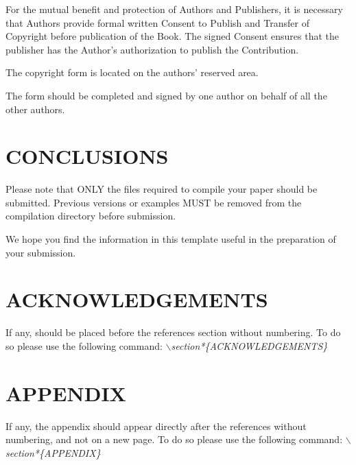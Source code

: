 \documentclass[a4paper,twoside]{article}
\begin{document}
For the mutual benefit and protection of Authors and
Publishers, it is necessary that Authors provide formal written
Consent to Publish and Transfer of Copyright before publication of
the Book. The signed Consent ensures that the publisher has the
Author's authorization to publish the Contribution.

The copyright form is located on the authors' reserved area.

The form should be completed and signed by one author on
behalf of all the other authors.

\section{\uppercase{Conclusions}}
\label{sec:conclusion}

Please note that ONLY the files required to compile your paper should be submitted. Previous versions or examples MUST be removed from the compilation directory before submission.

We hope you find the information in this template useful in the preparation of your submission.


\section*{\uppercase{Acknowledgements}}

If any, should be placed before the references section
without numbering. To do so please use the following command:
\textit{$\backslash$section*\{ACKNOWLEDGEMENTS\}}



{\small
}


\section*{\uppercase{Appendix}}

If any, the appendix should appear directly after the
references without numbering, and not on a new page. To do so please use the following command:
\textit{$\backslash$section*\{APPENDIX\}}
\end{document}
